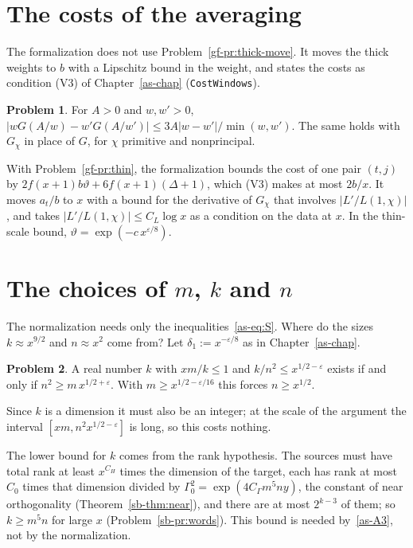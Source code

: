 \documentclass[reqno]{amsart}
\newcounter{chap}
\theoremstyle{definition}
\newtheorem{problem}{Problem}[section]
\theoremstyle{plain}
\newcommand{\tl}[1]{\texttt{#1}}
\begin{document}
\section{The costs of the averaging}\label{sec:costs}

The formalization does not use Problem~\ref{gf-pr:thick-move}.  It moves the thick weights to \(b\) with a Lipschitz bound in the weight, and states the costs as condition (V3) of Chapter~\ref{as-chap} (\tl{CostWindows}).

\begin{problem}\label{pr:lip}
For \(A > 0\) and \(w, w' > 0\),
\(
  \bigl\lvert wG(A/w) - w'G(A/w')\bigr\rvert \le 3A\lvert w - w'\rvert/\min(w, w')
\).
The same holds with \(G_\chi\) in place of \(G\), for \(\chi\) primitive and nonprincipal.
\end{problem}

With Problem~\ref{gf-pr:thin}, the formalization bounds the cost of one pair \((t, j)\) by \(2f(x+1)b\vartheta + 6f(x+1)(\Delta + 1)\), which (V3) makes at most \(2b/x\).  It moves \(a_t/b\) to \(x\) with a bound for the derivative of \(G_\chi\) that involves \(\lvert L'/L(1, \chi)\rvert\), and takes \(\lvert L'/L(1, \chi)\rvert \le C_L\log x\) as a condition on the data at \(x\).  In the thin-scale bound, \(\vartheta = \exp(-c\,x^{\varepsilon/8})\).

\section{The choices of \texorpdfstring{\(m\), \(k\) and \(n\)}{m, k and n}}\label{sec:choices}

The normalization needs only the inequalities~\eqref{as-eq:S}.  Where do the sizes \(k \approx x^{9/2}\) and \(n \approx x^2\) come from?  Let \(\delta_1 := x^{-\varepsilon/8}\) as in Chapter~\ref{as-chap}.

\begin{problem}\label{pr:compatible}
A real number \(k\) with \(xm/k \le 1\) and \(k/n^2 \le x^{1/2-\varepsilon}\) exists if and only if \(n^2 \ge m\,x^{1/2+\varepsilon}\).  With \(m \ge x^{1/2-\varepsilon/16}\) this forces \(n \ge x^{1/2}\).
\end{problem}

Since \(k\) is a dimension it must also be an integer; at the scale of the argument the interval \([xm, n^2x^{1/2-\varepsilon}]\) is long, so this costs nothing.

The lower bound for \(k\) comes from the rank hypothesis.  The sources must have total rank at least \(x^{C_H}\) times the dimension of the target, each has rank at most \(C_0\) times that dimension divided by \(\Gamma_0^2 = \exp(4C_\Gamma m^5ny)\), the constant of near orthogonality (Theorem~\ref{sb-thm:near}), and there are at most \(2^{k-3}\) of them; so \(k \ge m^5n\) for large \(x\) (Problem~\ref{sb-pr:words}).  This bound is needed by~\eqref{as-A3}, not by the normalization.
\end{document}
